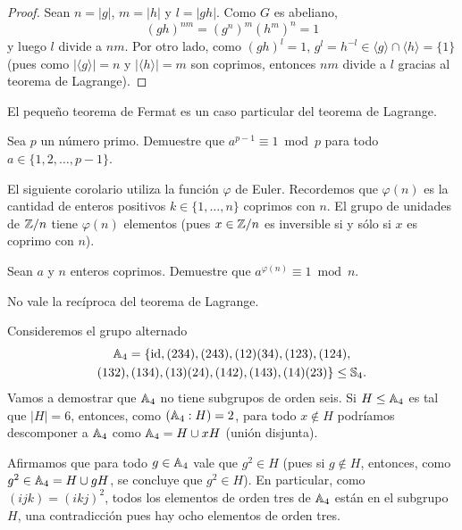 \begin{proof}
Sean $n=|g|$, $m=|h|$ y $l=|gh|$. Como $G$ es abeliano, 
\[
(gh)^{nm}=(g^n)^m(h^m)^n=1
\]
y luego $l$ divide a $nm$. Por otro lado, como $(gh)^l=1$, 
$g^l=h^{-l}\in \langle g\rangle\cap\langle h\rangle=\{1\}$ (pues como $|\langle g\rangle|=n$ y $|\langle h\rangle|=m$ son coprimos, 
entonces $nm$ divide a $l$ gracias al teorema de Lagrange). 
\end{proof}


El pequeño teorema de Fermat es un caso particular del teorema de Lagrange.

\begin{exercise}
	Sea $p$ un número primo. Demuestre que 
	$a^{p-1}\equiv1\bmod p$  
	para todo $a\in\{1,2,\dots,p-1\}$. 
\end{exercise}

El siguiente corolario utiliza la función $\varphi$ de Euler. Recordemos que
$\varphi(n)$ es la cantidad de enteros positivos $k\in\{1,\dots,n\}$ 
coprimos con $n$. El grupo de
unidades de $\mathbb{Z}/n$ tiene $\varphi(n)$ elementos (pues $x\in\mathbb{Z}/n$ es inversible
si y sólo si $x$ es coprimo con $n$). 

\begin{exercise}
	Sean $a$ y $n$ enteros coprimos. Demuestre que 
	$a^{\varphi(n)}\equiv1\bmod n$.
\end{exercise}

No vale la recíproca del teorema de Lagrange.

\begin{example}
Consideremos el grupo alternado 
\begin{multline*}
\mathbb{A}_4=\{\operatorname{id},(234),(243),(12)(34),(123),(124),\\(132),(134),(13)(24),(142),(143),(14)(23)\}\leq\mathbb{S}_4.	
\end{multline*}
Vamos a demostrar que $\mathbb{A}_4$ no tiene subgrupos de orden seis. Si $H\leq\mathbb{A}_4$ es tal que 
$|H|=6$, entonces, como $(\mathbb{A}_4:H)=2$, para todo $x\not\in H$ podríamos descomponer a $\mathbb{A}_4$ como $\mathbb{A}_4=H\cup xH$ (unión disjunta). 

Afirmamos que
para todo $g\in\mathbb{A}_4$ vale que $g^2\in H$ (pues si $g\not\in H$, entonces, como $g^2\in\mathbb{A}_4=H\cup gH$, se concluye que $g^2\in H$). En particular, como
$(ijk)=(ikj)^2$, 
todos los elementos de orden tres de $\mathbb{A}_4$ están en el subgrupo $H$, una contradicción pues hay ocho elementos de orden tres.   
\end{example}

